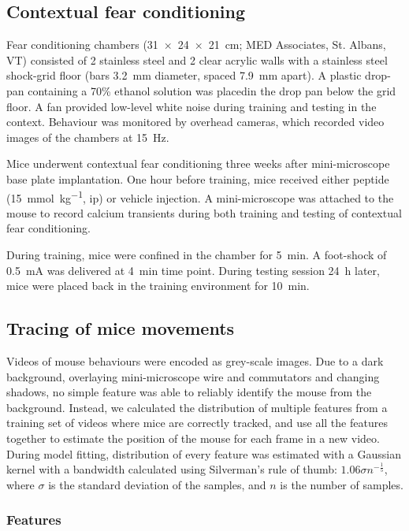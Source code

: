 \subsection{Contextual fear conditioning}
Fear conditioning chambers (\SI{31 x 24 x 21}{\cm}; MED Associates, St. Albans, VT) consisted of 2 stainless steel and 2 clear acrylic walls with a stainless steel shock-grid floor (bars \SI{3.2}{\mm} diameter, spaced \SI{7.9}{\mm} apart). A plastic drop-pan containing a 70\% ethanol solution was placedin the drop pan below the grid floor. A fan provided low-level white noise during training and testing in the context. Behaviour was monitored by overhead cameras, which recorded video images of the chambers at \SI{15}{\Hz}. 

Mice underwent contextual fear conditioning three weeks after mini-microscope base plate implantation. One hour before training, mice received either \tglu peptide (\SI{15}{\mmol\per\kg}, \gls{ip}) or vehicle injection. A mini-microscope was attached to the mouse to record calcium transients during both training and testing of contextual fear conditioning. 

During training, mice were confined in the chamber for \SI{5}{\minute}. A foot-shock of \SI{0.5}{\mA} was delivered at \SI{4}{\minute} time point. During testing session \SI{24}{\hour} later, mice were placed back in the training environment for \SI{10}{\minute}. 

\subsection{Tracing of mice movements}
Videos of mouse behaviours were encoded as grey-scale images. Due to a dark background, overlaying mini-microscope wire and commutators and changing shadows, no simple feature was able to reliably identify the mouse from the background. Instead, we calculated the distribution of multiple features from a training set of videos where mice are correctly tracked, and use all the features together to estimate the position of the mouse for each frame in a new video. During model fitting, distribution of every feature was estimated with a Gaussian kernel with a bandwidth calculated using Silverman's rule of thumb: $1.06\sigma n^{-\frac{1}{5}}$, where $\sigma$ is the standard deviation of the samples, and $n$ is the number of samples.

\subsubsection{Features}

